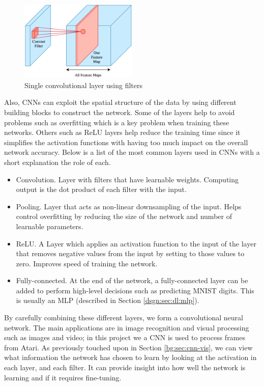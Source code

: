\begin{figure}[htbp]
	\centering
	\includegraphics[width=0.5\textwidth]{chapters/chapter3/images/cnn.png}
	\caption{Single convolutional layer using filters
		\label{fig:single-cnn-layer}
	}
\end{figure}

Also, CNNs can exploit the spatial structure of the data by using different building blocks to construct the network. Some of the layers help to avoid problems such as overfitting which is a key problem when training these networks. Others such as ReLU layers help reduce the training time since it simplifies the activation functions with having too much impact on the overall network accuracy. Below is a list of the most common layers used in CNNs with a short explanation the role of each.

\begin{itemize}
	\item Convolution. Layer with filters that have learnable weights. Computing output is the dot product of each filter with the input.
	\item Pooling. Layer that acts as non-linear downsampling of the input. Helps control overfitting by reducing the size of the network and number of learnable parameters.
	\item ReLU. A Layer which applies an activation function to the input of the layer that removes negative values from the input by setting to those values to zero. \cite{Romanuke2017} Improves speed of training the network.
	\item Fully-connected. At the end of the network, a fully-connected layer can be added to perform high-level decisions such as predicting MNIST digits. This is usually an MLP (described in Section \ref{dsgn:sec:dl:mlp}).
\end{itemize}

By carefully combining these different layers, we form a convolutional neural network. The main applications are in image recognition and visual processing such as images and video; in this project we a CNN is used to process frames from Atari. As previously touched upon in Section \ref{bg:sec:cnn-vis}, we can view what information the network has chosen to learn by looking at the activation in each layer, and each filter. It can provide insight into how well the network is learning and if it requires fine-tuning.

